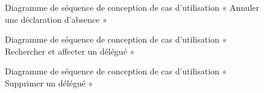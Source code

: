 \begin{figure}[H]
  \centering
  \caption{Diagramme de séquence de conception de cas d'utilisation « Annuler une déclaration d'absence »}
  \label{fig:conception_sequence_annuler_absence}
\end{figure}

\begin{figure}[H]
  \centering
  \caption{Diagramme de séquence de conception de cas d'utilisation «  Rechercher et affecter un délégué »}
  \label{fig:conception_sequence_search_affect_delegation}
\end{figure}

\begin{figure}[H]
  \centering
  \caption{Diagramme de séquence de conception de cas d'utilisation « Supprimer un délégué »}
  \label{fig:conception_sequence_annulation_delegation}
\end{figure}




